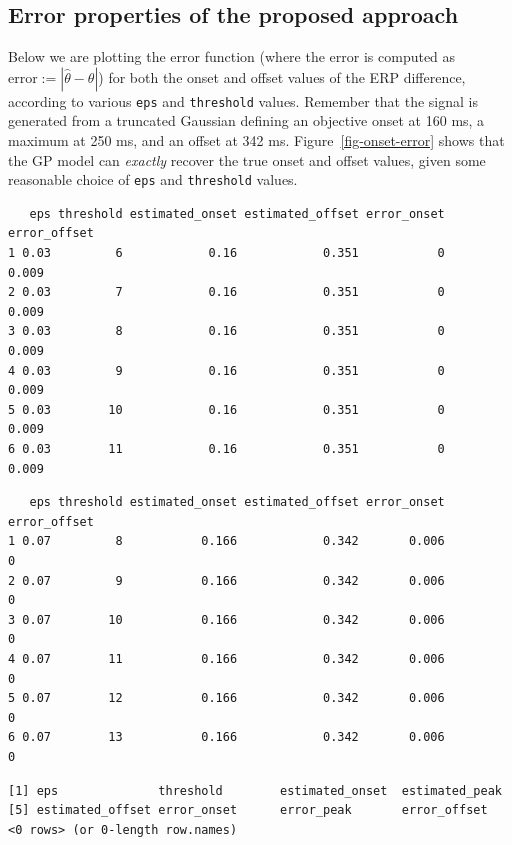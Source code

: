 \documentclass[
  doc,
  floatsintext,
  longtable,
  a4paper,
  nolmodern,
  notxfonts,
  notimes,
  colorlinks=true,linkcolor=blue,citecolor=blue,urlcolor=blue]{apa7}
\begin{document}
\newpage

\subsection{Error properties of the proposed
approach}\label{error-properties-of-the-proposed-approach}

Below we are plotting the error function (where the error is computed as
\(\text{error}:=|\hat{\theta}-\theta|\)) for both the onset and offset
values of the ERP difference, according to various \texttt{eps} and
\texttt{threshold} values. Remember that the signal is generated from a
truncated Gaussian defining an objective onset at 160 ms, a maximum at
250 ms, and an offset at 342 ms. Figure~\ref{fig-onset-error} shows that
the GP model can \emph{exactly} recover the true onset and offset
values, given some reasonable choice of \texttt{eps} and
\texttt{threshold} values.

\begin{verbatim}
   eps threshold estimated_onset estimated_offset error_onset error_offset
1 0.03         6            0.16            0.351           0        0.009
2 0.03         7            0.16            0.351           0        0.009
3 0.03         8            0.16            0.351           0        0.009
4 0.03         9            0.16            0.351           0        0.009
5 0.03        10            0.16            0.351           0        0.009
6 0.03        11            0.16            0.351           0        0.009
\end{verbatim}

\begin{verbatim}
   eps threshold estimated_onset estimated_offset error_onset error_offset
1 0.07         8           0.166            0.342       0.006            0
2 0.07         9           0.166            0.342       0.006            0
3 0.07        10           0.166            0.342       0.006            0
4 0.07        11           0.166            0.342       0.006            0
5 0.07        12           0.166            0.342       0.006            0
6 0.07        13           0.166            0.342       0.006            0
\end{verbatim}

\begin{verbatim}
[1] eps              threshold        estimated_onset  estimated_peak  
[5] estimated_offset error_onset      error_peak       error_offset    
<0 rows> (or 0-length row.names)
\end{verbatim}
\end{document}
